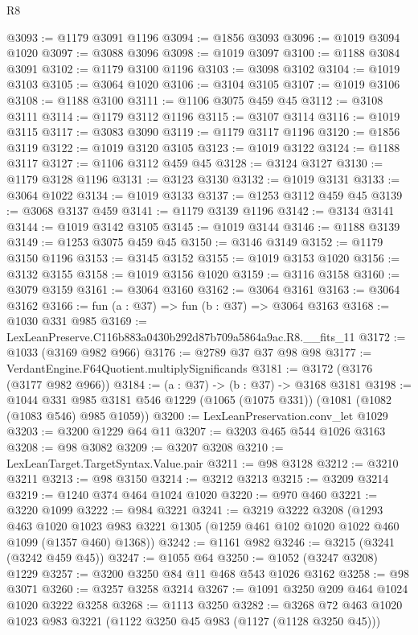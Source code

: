 \begin{lexlean}{R8}
\begin{coremodule}
@3093 := @1179 @3091 @1196
@3094 := @1856 @3093
@3096 := @1019 @3094 @1020
@3097 := @3088 @3096
@3098 := @1019 @3097
@3100 := @1188 @3084 @3091
@3102 := @1179 @3100 @1196
@3103 := @3098 @3102
@3104 := @1019 @3103
@3105 := @3064 @1020
@3106 := @3104 @3105
@3107 := @1019 @3106
@3108 := @1188 @3100
@3111 := @1106 @3075 @459 @45
@3112 := @3108 @3111
@3114 := @1179 @3112 @1196
@3115 := @3107 @3114
@3116 := @1019 @3115
@3117 := @3083 @3090
@3119 := @1179 @3117 @1196
@3120 := @1856 @3119
@3122 := @1019 @3120 @3105
@3123 := @1019 @3122
@3124 := @1188 @3117
@3127 := @1106 @3112 @459 @45
@3128 := @3124 @3127
@3130 := @1179 @3128 @1196
@3131 := @3123 @3130
@3132 := @1019 @3131
@3133 := @3064 @1022
@3134 := @1019 @3133
@3137 := @1253 @3112 @459 @45
@3139 := @3068 @3137 @459
@3141 := @1179 @3139 @1196
@3142 := @3134 @3141
@3144 := @1019 @3142 @3105
@3145 := @1019 @3144
@3146 := @1188 @3139
@3149 := @1253 @3075 @459 @45
@3150 := @3146 @3149
@3152 := @1179 @3150 @1196
@3153 := @3145 @3152
@3155 := @1019 @3153 @1020
@3156 := @3132 @3155
@3158 := @1019 @3156 @1020
@3159 := @3116 @3158
@3160 := @3079 @3159
@3161 := @3064 @3160
@3162 := @3064 @3161
@3163 := @3064 @3162
@3166 := fun (a : @37) => fun (b : @37) => @3064 @3163
@3168 := @1030 @331 @985
@3169 := LexLeanPreserve.C116b883a0430b292d87b709a5864a9ac.R8.__fits_11
@3172 := @1033 (@3169 @982 @966)
@3176 := @2789 @37 @37 @98 @98
@3177 := VerdantEngine.F64Quotient.multiplySignificands
@3181 := @3172 (@3176 (@3177 @982 @966))
@3184 := (a : @37) -> (b : @37) -> @3168 @3181
@3198 := @1044
    @331
    @985
    @3181
    @546
    @1229
    (@1065 (@1075 @331))
    (@1081 (@1082 (@1083 @546) @985 @1059))
@3200 := LexLeanPreservation.conv_let @1029
@3203 := @3200 @1229 @64 @11
@3207 := @3203 @465 @544 @1026 @3163
@3208 := @98 @3082
@3209 := @3207 @3208
@3210 := LexLeanTarget.TargetSyntax.Value.pair
@3211 := @98 @3128
@3212 := @3210 @3211
@3213 := @98 @3150
@3214 := @3212 @3213
@3215 := @3209 @3214
@3219 := @1240 @374 @464 @1024 @1020
@3220 := @970 @460
@3221 := @3220 @1099
@3222 := @984 @3221
@3241 := @3219
    @3222
    @3208
    (@1293
      @463
      @1020
      @1023
      @983
      @3221
      @1305
      (@1259 @461 @102 @1020 @1022 @460 @1099 (@1357 @460) @1368))
@3242 := @1161 @982
@3246 := @3215 (@3241 (@3242 @459 @45))
@3247 := @1055 @64
@3250 := @1052 (@3247 @3208) @1229
@3257 := @3200 @3250 @84 @11 @468 @543 @1026 @3162
@3258 := @98 @3071
@3260 := @3257 @3258 @3214
@3267 := @1091 @3250 @209 @464 @1024 @1020 @3222 @3258
@3268 := @1113 @3250
@3282 := @3268 @72 @463 @1020 @1023 @983 @3221 (@1122 @3250 @45 @983 (@1127 (@1128 @3250 @45)))

\end{coremodule}
\end{lexlean}
